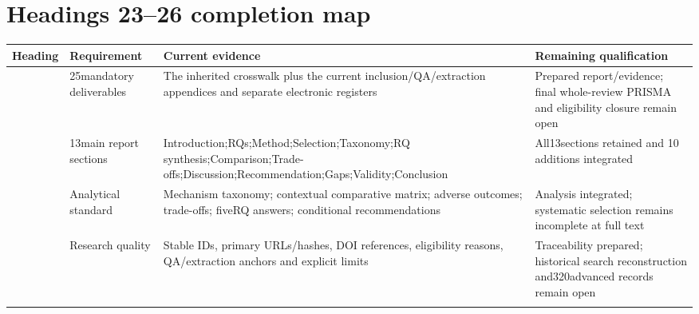 \clearpage\section{Headings 23--26 completion map}
\begin{longtable}{>{\raggedright\arraybackslash}p{}>{\raggedright\arraybackslash}p{}>{\raggedright\arraybackslash}p{}>{\raggedright\arraybackslash}p{}}
\toprule
\textbf{Heading} & \textbf{Requirement} & \textbf{Current evidence} & \textbf{Remaining qualification}\\\midrule\endhead
23 & 25mandatory deliverables & The inherited crosswalk plus the current inclusion/QA/extraction appendices and separate electronic registers & Prepared report/evidence;\allowbreak{} final whole-review PRISMA and eligibility closure remain open\\\addlinespace
24 & 13main report sections & Introduction;\allowbreak{}RQs;\allowbreak{}Method;\allowbreak{}Selection;\allowbreak{}Taxonomy;\allowbreak{}RQ synthesis;\allowbreak{}Comparison;\allowbreak{}Trade-offs;\allowbreak{}Discussion;\allowbreak{}Recommendation;\allowbreak{}Gaps;\allowbreak{}Validity;\allowbreak{}Conclusion & All13sections retained and 10 additions integrated\\\addlinespace
25 & Analytical standard & Mechanism taxonomy;\allowbreak{} contextual comparative matrix;\allowbreak{} adverse outcomes;\allowbreak{} trade-offs;\allowbreak{} fiveRQ answers;\allowbreak{} conditional recommendations & Analysis integrated;\allowbreak{} systematic selection remains incomplete at full text\\\addlinespace
26 & Research quality & Stable IDs,\allowbreak{} primary URLs/hashes,\allowbreak{} DOI references,\allowbreak{} eligibility reasons,\allowbreak{} QA/extraction anchors and explicit limits & Traceability prepared;\allowbreak{} historical search reconstruction and320advanced records remain open\\\addlinespace
\bottomrule\end{longtable}
